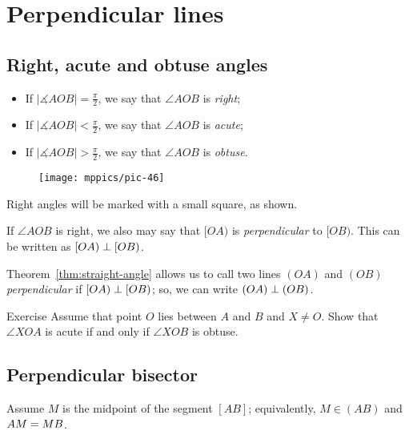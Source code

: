 \chapter{Perpendicular lines}\label{chap:perp}

\section{Right, acute and obtuse angles}

\begin{itemize}
\item If $|\measuredangle A O B|=\tfrac\pi2$, we say that $\angle A O B$ is \emph{right};
\item If $|\measuredangle A O B|<\tfrac\pi2$, we say that $\angle A O B$ is 
\emph{acute};
\item If $|\measuredangle A O B|>\tfrac\pi2$, we say that $\angle A O B$ is \emph{obtuse}.
\end{itemize}

\begin{wrapfigure}[2]{r}{25mm}
\vskip-25mm
\centering
\texttt{[image: mppics/pic-46]}
\end{wrapfigure}

Right angles will be marked with a small square, as shown.

If $\angle A O B$ is right, we also may say that $[O A)$ is \emph{perpendicular} to $[O B)$.
This can be written as $[O A)\perp [O B)$.

Theorem~\ref{thm:straight-angle} allows us to call two lines $(O A)$ and $(O B)$ {}\emph{perpendicular} if $[O A)\perp [O B)$; so, we can write $(O A)\perp (O B)$.

\begin{thm}{Exercise}\label{ex:acute-obtuce}
Assume that point $O$ lies between $A$ and $B$ and $X\ne O$.
Show that 
$\angle XOA$ is acute if and only if 
$\angle XOB$ is obtuse.
\end{thm}

\section{Perpendicular bisector}

Assume $M$ is the midpoint of the segment $[AB]$;
equivalently, $M\in(A B)$ and $A M = M B$.

